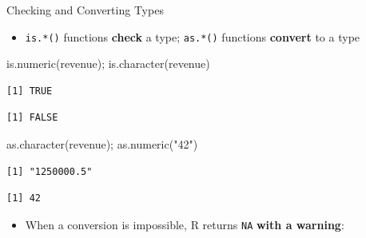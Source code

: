 \documentclass[
  ignorenonframetext,
  aspectratio=169,
]{beamer}
\newenvironment{Shaded}{\begin{snugshade}}{\end{snugshade}}
\newcommand{\FunctionTok}[1]{\textcolor[rgb]{0.28,0.35,0.67}{#1}}
\newcommand{\NormalTok}[1]{\textcolor[rgb]{0.00,0.23,0.31}{#1}}
\newcommand{\StringTok}[1]{\textcolor[rgb]{0.13,0.47,0.30}{#1}}
\providecommand{\tightlist}{%
  \setlength{\itemsep}{0pt}\setlength{\parskip}{0pt}}\usepackage{longtable,booktabs,array}
\begin{document}
\begin{frame}[fragile]{Checking and Converting Types}
\protect\hypertarget{sec-convert}{}
\begin{itemize}
\tightlist
\item
  \texttt{is.*()} functions \textbf{check} a type; \texttt{as.*()}
  functions \textbf{convert} to a type
\end{itemize}

\begin{Shaded}
\begin{Highlighting}[]
\FunctionTok{is.numeric}\NormalTok{(revenue); }\FunctionTok{is.character}\NormalTok{(revenue)}
\end{Highlighting}
\end{Shaded}

\begingroup\tiny\color{darkgray}

\begin{verbatim}
[1] TRUE
\end{verbatim}

\endgroup

\begingroup\tiny\color{darkgray}

\begin{verbatim}
[1] FALSE
\end{verbatim}

\endgroup

\begin{Shaded}
\begin{Highlighting}[]
\FunctionTok{as.character}\NormalTok{(revenue); }\FunctionTok{as.numeric}\NormalTok{(}\StringTok{"42"}\NormalTok{)}
\end{Highlighting}
\end{Shaded}

\begingroup\tiny\color{darkgray}

\begin{verbatim}
[1] "1250000.5"
\end{verbatim}

\endgroup

\begingroup\tiny\color{darkgray}

\begin{verbatim}
[1] 42
\end{verbatim}

\endgroup

\begin{itemize}
\tightlist
\item
  When a conversion is impossible, R returns \texttt{NA} \textbf{with a
  warning}:
\end{itemize}


\end{frame}
\end{document}
